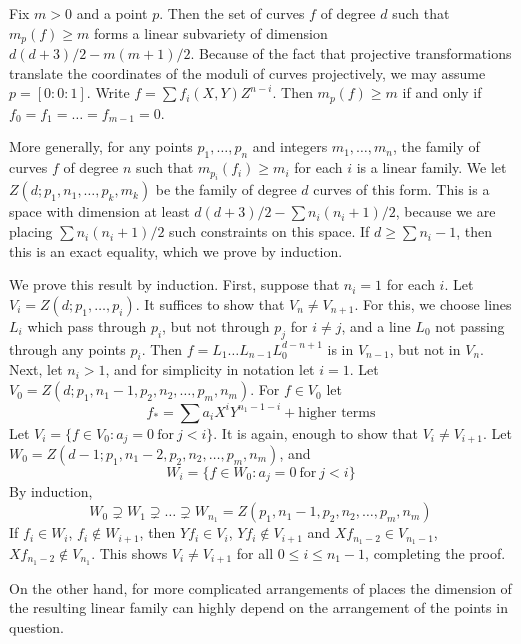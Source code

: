 \begin{example}
    Fix $m > 0$ and a point $p$. Then the set of curves $f$ of degree $d$ such that $m_p(f) \geq m$ forms a linear subvariety of dimension $d(d+3)/2 - m(m+1)/2$. Because of the fact that projective transformations translate the coordinates of the moduli of curves projectively, we may assume $p = [0:0:1]$. Write $f = \sum f_i(X,Y)Z^{n-i}$. Then $m_p(f) \geq m$ if and only if $f_0 = f_1 = \dots = f_{m-1} = 0$. 

    More generally, for any points $p_1,\dots,p_n$ and integers $m_1,\dots,m_n$, the family of curves $f$ of degree $n$ such that $m_{p_i}(f_i) \geq m_i$ for each $i$ is a linear family. We let $Z(d;p_1,n_1,\dots,p_k,m_k)$ be the family of degree $d$ curves of this form. This is a space with dimension at least $d(d+3)/2 - \sum n_i(n_i+1)/2$, because we are placing $\sum n_i(n_i+1)/2$ such constraints on this space. If $d \geq \sum n_i - 1$, then this is an exact equality, which we prove by induction.

    We prove this result by induction. First, suppose that $n_i = 1$ for each $i$. Let $V_i = Z(d;p_1,\dots,p_i)$. It suffices to show that $V_n \neq V_{n+1}$. For this, we choose lines $L_i$ which pass through $p_i$, but not through $p_j$ for $i \neq j$, and a line $L_0$ not passing through any points $p_i$. Then $f = L_1 \dots L_{n-1}L_0^{d-n+1}$ is in $V_{n-1}$, but not in $V_n$. Next, let $n_i > 1$, and for simplicity in notation let $i = 1$. Let $V_0 = Z(d;p_1,n_1-1,p_2,n_2, \dots,p_m,n_m)$. For $f \in V_0$ let
    \[ f_* = \sum a_iX^iY^{n_1-1-i} + \text{higher terms} \]
    Let $V_i = \{ f \in V_0: a_j = 0\ \text{for}\ j < i \}$. It is again, enough to show that $V_i \neq V_{i+1}$. Let $W_0 = Z(d-1;p_1,n_1-2,p_2,n_2, \dots, p_m,n_m)$, and
    \[ W_i = \{ f \in W_0: a_j = 0\ \text{for}\ j < i \} \]
    By induction,
    \[ W_0 \supsetneq W_1 \supsetneq \dots \supsetneq W_{n_1} = Z(p_1,n_1-1,p_2,n_2, \dots,p_m,n_m) \]
    If $f_i \in W_i$, $f_i \not \in W_{i+1}$, then $Yf_i \in V_i$, $Yf_i \not \in V_{i+1}$ and $Xf_{n_1-2} \in V_{n_1-1}$, $Xf_{n_1-2} \not \in V_{n_1}$. This shows $V_i \neq V_{i+1}$ for all $0 \leq i \leq n_1 - 1$, completing the proof.
\end{example}

On the other hand, for more complicated arrangements of places the dimension of the resulting linear family can highly depend on the arrangement of the points in question.

